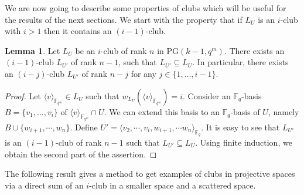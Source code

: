 \documentclass[11pt]{amsart}
\theoremstyle{definition}
\newtheorem{lemma}[theorem]{Lemma}
\newtheorem{construction}[theorem]{Construction}
\newcommand{\F}{{\mathbb F}}
\newcommand{\fq}{{\mathbb F}_{q}}
\newcommand{\PG}{\mathrm{PG}}
\newcommand{\fqm}{\mathbb{F}_{q^m}}
\begin{document}



We are now going to describe some properties of clubs which will be useful for the results of the next sections. We start with the property that if $L_U$ is an $i$-club with $i>1$ then it contains an $(i-1)$-club.

\begin{lemma}\label{lemma:subclub}
    Let $L_U$ be an $i$-club of rank $n$ in $\PG(k-1,q^m)$. There exists an $(i-1)$-club $L_{U'}$ of rank $n-1$, such that $L_{U'}\subseteq L_U$. 
    In particular, there exists an $(i-j)$-club $L_{U'}$ of rank $n-j$ for any $j\in \{1,\ldots,i-1\}$.
\end{lemma}
\begin{proof}
    Let $\langle v \rangle_{\fqm} \in L_U$ such that $w_{L_U}(\langle v \rangle_{\fqm})=i$. Consider an $\fq$-basis $B=\{v_1,\ldots, v_i\}$ of $\langle v \rangle_{\fqm}\cap U$. We can extend this basis to an $\fq$-basis of $U$, namely $B \cup \{w_{i+1},\cdots, w_{n}\}$. Define $U'=\langle v_2, \cdots, v_i, w_{i+1},\cdots w_n\rangle_{\fq}$. It is easy to see that $L_{U'}$ is an $(i-1)$-club of rank $n-1$ such that $L_{U'}\subseteq L_U$.
    Using finite induction, we obtain the second part of the assertion.
\end{proof}

The following result gives a method to get examples of clubs in projective spaces via a direct sum of an $i$-club in a smaller space and a scattered space.
\end{document}
